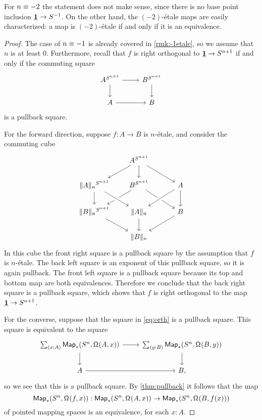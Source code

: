 \documentclass[9pt,twosided]{amsart}
\begin{document}
\begin{rmk}
  For $n\equiv -2$ the statement does not make sense, since there is no base point inclusion $\underline{\mathbf{1}}\to S^{-1}$. On the other hand, the $(-2)$-\'etale maps are easily characterized: a map is $(-2)$-\'etale if and only if it is an equivalence.
\end{rmk}


\begin{proof}
  The case of $n\equiv -1$ is already covered in \cref{rmk:-1etale}, so we assume that $n$ is at least $0$. Furthermore, recall that $f$ is right orthogonal to $\underline{\mathbf{1}}\to S^{n+1}$ if and only if the commuting square
    \begin{equation}\label{eq:orth}
      \begin{tikzcd}
        A^{\sphere{n+1}} \arrow[r] \arrow[d] & B^{\sphere{n+1}} \arrow[d] \\
        A \arrow[r] & B
      \end{tikzcd}
    \end{equation}
    is a pullback square.

  For the forward direction, suppose $f:A\to B$ is $n$-\'etale, and consider the commuting cube
\begin{equation*}
\begin{tikzcd}
&[-1ex] A^{\sphere{n+1}} \arrow[dl] \arrow[d] \arrow[dr] &[2ex] \\
\trunc{n}{A}^{\sphere{n+1}} \arrow[d] & B^{\sphere{n+1}} \arrow[dl] \arrow[dr] & A \arrow[dl,crossing over] \arrow[d] \\
\trunc{n}{B}^{\sphere{n+1}} \arrow[dr] & \trunc{n}{A} \arrow[d] \arrow[from=ul,crossing over] & B \arrow[dl] \\
& \trunc{n}{B}
\end{tikzcd}
\end{equation*}
In this cube the front right square is a pullback square by the assumption that $f$ is $n$-\'etale. The back left square is an exponent of this pullback square, so it is again pullback. The front left square is a pullback square because its top and bottom map are both equivalences. Therefore we conclude that the back right square is a pullback square, which shows that $f$ is right orthogonal to the map $\underline{\mathbf{1}}\to S^{n+1}$.

  For the converse, suppose that the square in \cref{eq:orth} is a pullback square. This square is equivalent to the square
  \begin{equation*}
    \begin{tikzcd}
      \sm{x:A}\mathsf{Map}_\ast(\sphere{n},\loopspace{A,x}) \arrow[r] \arrow[d] & \sm{y:B} \mathsf{Map}_\ast(\sphere{n},\loopspace{B,y}) \arrow[d] \\
      A \arrow[r] & B,
    \end{tikzcd}
  \end{equation*}
  so we see that this is a pullback square. By \cref{thm:pullback} it follows that the map
  \begin{equation*}
    \mathsf{Map}_\ast(S^{n},\mathsf{\Omega}^{}(f,x)):\mathsf{Map}_\ast(S^{n},\mathsf{\Omega}^{}(A,x)) \to \mathsf{Map}_\ast(S^{n},\mathsf{\Omega}^{}(B,f(x)))
  \end{equation*}
  of pointed mapping spaces is an equivalence, for each $x:A$.


\end{proof}
\end{document}
